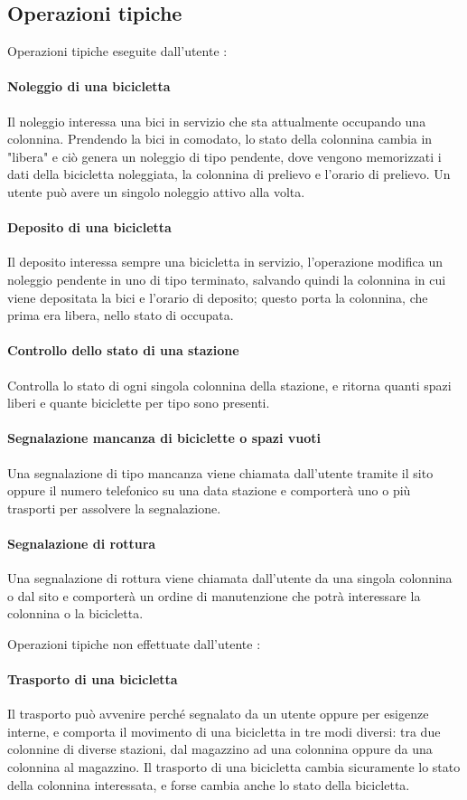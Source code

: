 \documentclass[a4paper,twoside]{article}
\begin{document}
\subsection{Operazioni tipiche}
Operazioni tipiche eseguite dall'utente :
\paragraph{Noleggio di una bicicletta} Il noleggio interessa una bici in servizio che sta attualmente occupando una colonnina. Prendendo la bici in comodato, lo stato della colonnina cambia in "libera" e ciò genera un noleggio di tipo pendente, dove vengono memorizzati i dati della bicicletta noleggiata, la colonnina di prelievo e l'orario di prelievo. Un utente può avere un singolo noleggio attivo alla volta.
\paragraph{Deposito di una bicicletta} Il deposito interessa sempre una bicicletta in servizio, l'operazione modifica un noleggio pendente in uno di tipo terminato, salvando quindi la colonnina in cui viene depositata la bici e l'orario di deposito; questo porta la colonnina, che prima era libera, nello stato di occupata.
\paragraph{Controllo dello stato di una stazione} Controlla lo stato di ogni singola colonnina della stazione, e ritorna quanti spazi liberi e quante biciclette per tipo sono presenti.
\paragraph{Segnalazione mancanza di biciclette o spazi vuoti} Una segnalazione di tipo mancanza viene chiamata dall'utente tramite il sito oppure il numero telefonico su una data stazione e comporterà uno o più trasporti per assolvere la segnalazione.
\paragraph{Segnalazione di rottura} Una segnalazione di rottura viene chiamata dall'utente da una singola colonnina o dal sito e comporterà un ordine di manutenzione che potrà interessare la colonnina o la bicicletta.
\par Operazioni tipiche non effettuate dall'utente :
\paragraph{Trasporto di una bicicletta} Il trasporto può avvenire perché segnalato da un utente oppure per esigenze interne, e comporta il movimento di una bicicletta in tre modi diversi: tra due colonnine di diverse stazioni, dal magazzino ad una colonnina oppure da una colonnina al magazzino. Il trasporto di una bicicletta cambia sicuramente lo stato della colonnina interessata, e forse cambia anche lo stato della bicicletta.
\end{document}
